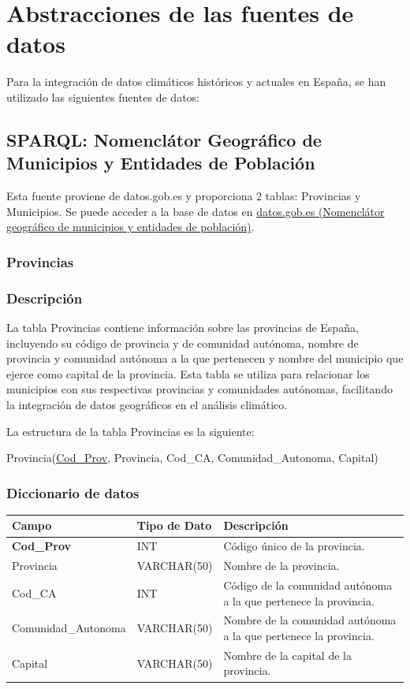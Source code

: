 \documentclass[12pt, a4paper]{article}
\begin{document}
\section{Abstracciones de las fuentes de datos}
Para la integración de datos climáticos históricos y actuales en España, se han utilizado las siguientes fuentes de datos:

\subsection{SPARQL: Nomenclátor Geográfico de Municipios y Entidades de Población}
Esta fuente proviene de datos.gob.es y proporciona 2 tablas: Provincias y Municipios. 
Se puede acceder a la base de datos en \href{https://datos.gob.es/es/catalogo/e00125901-spaignnomenclatorgeograficomunicipiosentpob201503240000}{datos.gob.es (Nomenclátor geográfico de municipios y entidades de población)}.

\subsubsection{Provincias}
\subsubsection*{Descripción}
La tabla Provincias contiene información sobre las provincias de España,
incluyendo su código de provincia y de comunidad autónoma, nombre de provincia y comunidad autónoma a la que pertenecen y nombre del municipio que ejerce como capital de la provincia.
Esta tabla se utiliza para relacionar los municipios con sus respectivas provincias y comunidades autónomas, facilitando la integración de datos geográficos en el análisis climático.

La estructura de la tabla Provincias es la siguiente:

Provincia(\underline{Cod\_Prov}, Provincia, Cod\_CA, Comunidad\_Autonoma, Capital)

\subsubsection*{Diccionario de datos}
\begin{center}
\begin{tabular}{|p{}|p{}|p{}|}
\hline
\textbf{Campo} & \textbf{Tipo de Dato} & \textbf{Descripción} \\
\hline
\textbf{Cod\_Prov} & INT & Código único de la provincia. \\
Provincia & VARCHAR(50) & Nombre de la provincia. \\
Cod\_CA & INT & Código de la comunidad autónoma a la que pertenece la provincia. \\
Comunidad\_Autonoma & VARCHAR(50) & Nombre de la comunidad autónoma a la que pertenece la provincia. \\
Capital & VARCHAR(50) & Nombre de la capital de la provincia. \\
\hline
\end{tabular}
\end{center}
\end{document}
